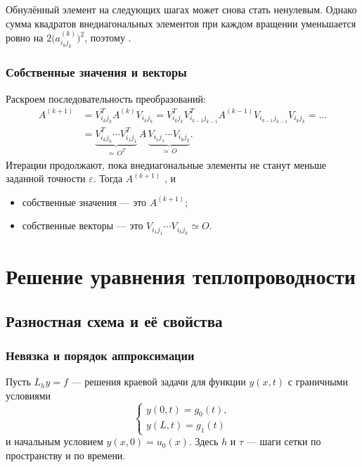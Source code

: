\documentclass[../final.tex]{subfiles}
\begin{document}
\remark
Обнулённый элемент на следующих шагах может снова стать ненулевым.
Однако сумма квадратов внедиагональных элементов при каждом вращении
уменьшается ровно на $2\bigl(a^{(k)}_{i_kj_k}\bigr)^2$, поэтому
.

\subsection{Собственные значения и векторы}

Раскроем последовательность преобразований:
\begin{align*}
    A^{(k+1)}
    &=V_{i_kj_k}^TA^{(k)}V_{i_kj_k}
    =V_{i_kj_k}^TV_{i_{k-1}j_{k-1}}^TA^{(k-1)}
    V_{i_{k-1}j_{k-1}}V_{i_kj_k}=\ldots\\
    &=\underbrace{V_{i_kj_k}^T\cdots V_{i_1j_1}^T}_{\simeq\,O^T}\,
    A\,
    \underbrace{V_{i_1j_1}\cdots V_{i_kj_k}}_{\simeq\,O}.
\end{align*}
Итерации продолжают, пока внедиагональные элементы не станут
меньше заданной точности $\varepsilon$. Тогда $A^{(k+1)}$
, и
\begin{itemize}
    \item собственные значения --- это 
    $A^{(k+1)}$;
    \item собственные векторы --- это 
    $V_{i_1j_1}\cdots V_{i_kj_k}\simeq O$.
\end{itemize}


\chapter{Решение уравнения теплопроводности}

\section{Разностная схема и её свойства}

\subsection{Невязка и порядок аппроксимации}

Пусть $L_hy=f$ ---  решения краевой задачи
для функции $y(x,t)$ с граничными условиями
\begin{equation*}
    \begin{cases}
        y(0,t)=g_0(t),\\
        y(L,t)=g_1(t)
    \end{cases}
\end{equation*}
и начальным условием $y(x,0)=u_0(x)$.
Здесь $h$ и $\tau$ --- шаги сетки по пространству и по времени.
\end{document}
